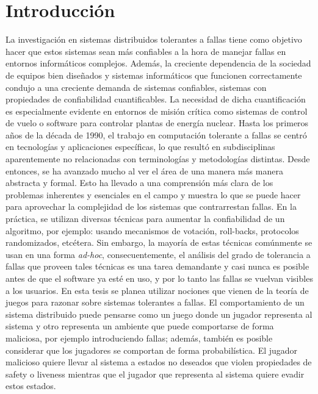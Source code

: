 \chapter{Introducci\'on}
\label{cap:introduccion}

La investigación en sistemas distribuidos tolerantes a fallas tiene como objetivo hacer que estos sistemas sean más confiables a la hora de manejar fallas en entornos informáticos complejos. Además, la creciente dependencia de la sociedad de equipos bien diseñados y sistemas informáticos que funcionen correctamente
condujo a una creciente demanda de sistemas confiables, sistemas con propiedades de confiabilidad cuantificables. La necesidad de
dicha cuantificación es especialmente evidente en entornos de misión crítica como sistemas de control de vuelo o software para controlar plantas de energía nuclear. Hasta los primeros años de la década de 1990, el trabajo en computación tolerante a fallas
se centró en tecnologías y aplicaciones específicas, lo que resultó en subdisciplinas aparentemente no relacionadas con terminologías y metodologías distintas.
Desde entonces, se ha avanzado mucho al ver el área de una manera más
manera abstracta y formal. Esto ha llevado a
una comprensión más clara de los problemas inherentes y esenciales en el campo y muestra lo que se puede hacer para aprovechar la
complejidad de los sistemas que contrarrestan
fallas. 
En la práctica, se utilizan diversas técnicas para aumentar la confiabilidad de un algoritmo, por ejemplo: usando mecanismos de votación, roll-backs, protocolos randomizados, etcétera. Sin embargo, la mayoría de estas técnicas comúnmente se usan en una forma \emph{ad-hoc}, consecuentemente,  el análisis del grado de tolerancia a fallas que proveen tales técnicas es una tarea demandante y casi nunca es posible antes de que el software ya esté en uso, y por lo tanto las fallas se vuelvan visibles a los usuarios.
En esta tesis se planea utilizar nociones que vienen de la teoría de juegos \cite{AptG11} para razonar sobre sistemas tolerantes a fallas. El comportamiento de un sistema distribuido puede pensarse como un juego donde un jugador representa al sistema y otro representa un ambiente que puede comportarse de forma maliciosa, por ejemplo introduciendo fallas; además, también es posible considerar que los jugadores se comportan de forma probabilística. El jugador malicioso quiere llevar al sistema a estados no deseados que violen propiedades de safety o liveness mientras que el jugador que representa al sistema quiere evadir estos estados.

